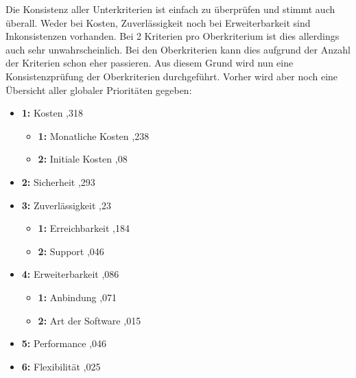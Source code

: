 Die Konsistenz aller Unterkriterien ist einfach zu überprüfen und stimmt auch überall. Weder bei Kosten, Zuverlässigkeit noch bei Erweiterbarkeit sind Inkonsistenzen vorhanden. Bei 2 Kriterien pro Oberkriterium ist dies allerdings auch sehr unwahrscheinlich. Bei den Oberkriterien kann dies aufgrund der Anzahl der Kriterien schon eher passieren. Aus diesem Grund wird nun eine Konsistenzprüfung der Oberkriterien durchgeführt.\newpage
Vorher wird aber noch eine Übersicht aller globaler Prioritäten gegeben:  
\begin{itemize}
	\item \textbf{1:} Kosten \enspace\dotfill{},318\enspace\enspace\enspace
	\begin{itemize}
		\item \textbf{1:} Monatliche Kosten \enspace\dotfill{},238\enspace\enspace\enspace
		\item \textbf{2:} Initiale Kosten \enspace\dotfill{},08\enspace\enspace\enspace
	\end{itemize}
	\item \textbf{2:} Sicherheit \enspace\dotfill{},293\enspace\enspace\enspace
	\item \textbf{3:} Zuverlässigkeit \enspace\dotfill{},23\enspace\enspace\enspace
	\begin{itemize}
		\item \textbf{1:} Erreichbarkeit \enspace\dotfill{},184\enspace\enspace\enspace
		\item \textbf{2:} Support \enspace\dotfill{},046\enspace\enspace\enspace
	\end{itemize}
	\item \textbf{4:} Erweiterbarkeit \enspace\dotfill{},086\enspace\enspace\enspace
	\begin{itemize}
		\item \textbf{1:} Anbindung \enspace\dotfill{},071\enspace\enspace\enspace
		\item \textbf{2:} Art der Software \enspace\dotfill{},015\enspace\enspace\enspace
	\end{itemize}
	\item \textbf{5:} Performance \enspace\dotfill{},046\enspace\enspace\enspace
	\item \textbf{6:} Flexibilität \enspace\dotfill{},025\enspace\enspace\enspace
\end{itemize}
\newpage
